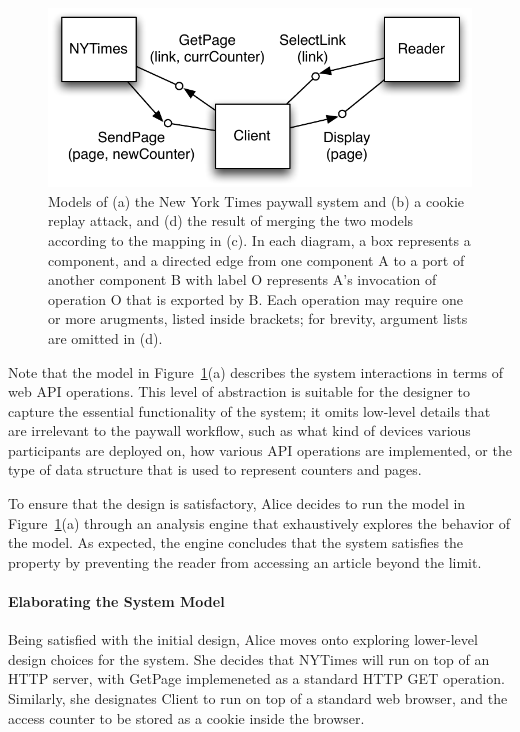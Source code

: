 \begin{figure}[!t]
\centering
\includegraphics[width=1.0\textwidth]{diagrams/nytimes}
\caption{Models of (a) the New York Times paywall system and (b) a
  cookie replay attack, and (d) the result of merging the two models
  according to the mapping in (c). In each diagram, a box represents a
  component, and a directed edge from one component \textsf{A} to a
  port of another component \textsf{B} with label \textsf{O}
  represents \textsf{A}'s invocation of operation \textsf{O} that is
  exported by \textsf{B}. Each operation may require one or more
  arugments, listed inside brackets; for brevity, argument lists are
  omitted in (d).}
\label{fig-nytimes}
\end{figure}

Note that the model in Figure~\ref{fig-nytimes}(a) describes the system
interactions in terms of web API operations. This level of abstraction
is suitable for the designer to capture the essential functionality of
the system; it omits low-level details that are irrelevant to the
paywall workflow, such as what kind of devices various participants
are deployed on, how various API operations are implemented, or the
type of data structure that is used to represent counters and pages.

To ensure that the design is satisfactory, Alice decides to run the
model in Figure~\ref{fig-nytimes}(a) through an analysis engine that
exhaustively explores the behavior of the model. As expected, the
engine concludes that the system satisfies the property by preventing
the reader from accessing an article beyond the limit.

\paragraph{\textbf{Elaborating the System Model}} Being satisfied with the
initial design, Alice moves onto exploring lower-level design
choices for the system. She decides that \textsf{NYTimes} will run on
top of an HTTP server, with \textsf{GetPage} implemeneted as a
standard HTTP GET operation. Similarly, she
designates \textsf{Client} to run on top of a standard web browser,
and the access counter to be stored as a cookie inside the browser.

